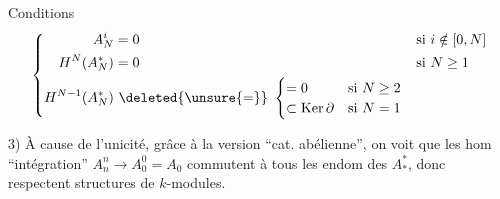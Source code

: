 Conditions 
\[
\left\{
\begin{aligned}
A_N^i&=0&&\text{si }i\notin[0,N]\\
H^N(A_N^*)&=0&&\text{si }N\geq1\\
H^{N-1}(A_N^*)&\ \deleted{\unsure{=}}\ 
\begin{cases}
=0&\text{si }N\geq2\\
\subset\operatorname{Ker}\partial&\text{si }N=1
\end{cases}
\end{aligned}
\right.
\]

3) À cause de l'unicité,  grâce à la version ``cat. abélienne'', on voit que les hom ``intégration''
$A_n^n\longrightarrow A_0^0=A_0$ commutent à tous les endom des $A_*^*$, donc respectent  structures de $k$-modules.

